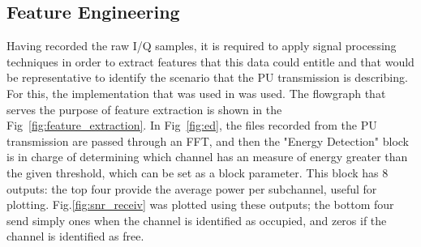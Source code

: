 \subsection{Feature Engineering}\label{ch:features}
Having recorded the raw I/Q samples, it is required to apply signal processing techniques in order to extract features that this data could entitle and that would be representative to identify the scenario that the \ac{PU} transmission is describing. For this, the implementation that was used in \cite{Wunsch2017} was used. The flowgraph that serves the purpose of feature extraction is shown in the Fig~\ref{fig:feature_extraction}. In Fig~\ref{fig:ed}, the files recorded from the \ac{PU} transmission are passed through an \ac{FFT}, and then the "Energy Detection" block is in charge of determining which channel has an measure of energy greater than the given threshold, which can be set as a block parameter. This block has 8 outputs: the top four provide the average power per subchannel, useful for plotting. Fig.\ref{fig:snr_receiv} was plotted using these outputs; the bottom four send simply ones when the channel is identified as occupied, and zeros if the channel is identified as free.

